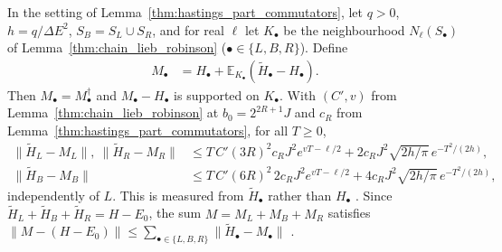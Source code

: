 \begin{lemma}
    \label{thm:hastings_localized_parts}
    \leanok
    In the setting of Lemma~\ref{thm:hastings_part_commutators}, let $q>0$,
    $h=q/\Delta E^2$, $S_B=S_L\cup S_R$, and for real $\ell$ let $K_\bullet$ be
    the neighbourhood $N_\ell(S_\bullet)$ of Lemma~\ref{thm:chain_lieb_robinson}
    ($\bullet\in\{L,B,R\}$). Define
    \begin{align}
        M_\bullet & =H_\bullet+\mathbb E_{K_\bullet}(\widetilde H_\bullet-H_\bullet).
        \label{eq:hastings_localized_part_def}
    \end{align}
    Then $M_\bullet=M_\bullet^\dagger$ and $M_\bullet-H_\bullet$ is supported
    on $K_\bullet$. With $(C',v)$ from Lemma~\ref{thm:chain_lieb_robinson} at
    $b_0=2^{2R+1}J$ and $c_R$ from Lemma~\ref{thm:hastings_part_commutators},
    for all $T\ge0$,
    \begin{align}
        \|\widetilde H_L-M_L\|,\ \|\widetilde H_R-M_R\|
         & \le T\,C'(3R)^2c_RJ^2e^{vT-\ell/2}
        +2c_RJ^2\sqrt{2h/\pi}\,e^{-T^2/(2h)},
        \label{eq:hastings_localized_parts_lr}   \\
        \|\widetilde H_B-M_B\|
         & \le T\,C'(6R)^2\,2c_RJ^2e^{vT-\ell/2}
        +4c_RJ^2\sqrt{2h/\pi}\,e^{-T^2/(2h)},
        \label{eq:hastings_localized_parts_b}
    \end{align}
    independently of $L$. This is
    \cite[lines 816--828]{Hastings2007AreaLaw} measured from
    $\widetilde H_\bullet$ rather than $H_\bullet$
    \cite{gap:hastings07_filtered_part_localization}. Since
    $\widetilde H_L+\widetilde H_B+\widetilde H_R=H-E_0$, the sum
    $M=M_L+M_B+M_R$ satisfies
    $\|M-(H-E_0)\|\le\sum_{\bullet\in\{L,B,R\}}\|\widetilde H_\bullet-M_\bullet\|$
    \cite[lines 766--767, 849--850]{Hastings2007AreaLaw}.
\end{lemma}

